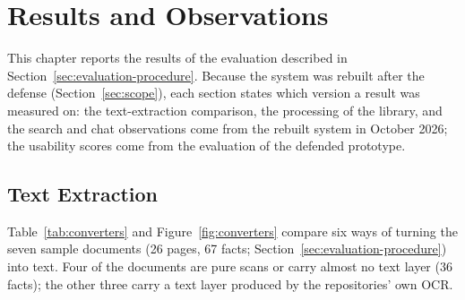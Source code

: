\chapter{Results and Observations}\label{ch:results}

This chapter reports the results of the evaluation described in Section~\ref{sec:evaluation-procedure}. Because the system was rebuilt after the defense (Section~\ref{sec:scope}), each section states which version a result was measured on: the text-extraction comparison, the processing of the library, and the search and chat observations come from the rebuilt system in October 2026; the usability scores come from the evaluation of the defended prototype.

\section{Text Extraction}\label{sec:converter-comparison}

Table~\ref{tab:converters} and Figure~\ref{fig:converters} compare six ways of turning the seven sample documents (26 pages, 67 facts; Section~\ref{sec:evaluation-procedure}) into text. Four of the documents are pure scans or carry almost no text layer (36 facts); the other three carry a text layer produced by the repositories' own OCR.

